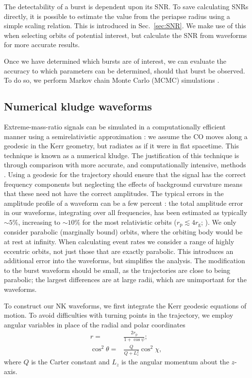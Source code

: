 \documentclass[useAMS,usedcolumn,usegraphicx,usenatbib]{mn2e}
\newcommand{\secref}[1]{Sec.~\ref{sec:#1}}
\newcommand{\sub}[1]{\ensuremath{_\mathrm{#1}}}
\begin{document}
The detectability of a burst is dependent upon its SNR. To save calculating SNRs directly, it is possible to estimate the value from the periapse radius using a simple scaling relation. This is introduced in \secref{SNR}. We make use of this when selecting orbits of potential interest, but calculate the SNR from waveforms for more accurate results.

Once we have determined which bursts are of interest, we can evaluate the accuracy to which parameters can be determined, should that burst be observed. To do so, we perform Markov chain Monte Carlo (MCMC) simulations \citep[chapter 29]{MacKay2003}.

\subsection{Numerical kludge waveforms}\label{sec:NK}

Extreme-mass-ratio signals can be simulated in a computationally efficient manner using a semirelativistic approximation \citep{Ruffini1981}: we assume the CO moves along a geodesic in the Kerr geometry, but radiates as if it were in flat spacetime. This technique is known as a numerical kludge. The justification of this technique is through comparison with more accurate, and computationally intensive, methods \citep{Gair2005, Babak2007}. Using a geodesic for the trajectory should ensure that the signal has the correct frequency components but neglecting the effects of background curvature means that these need not have the correct amplitudes. The typical errors in the amplitude profile of a waveform can be a few percent \citep{Tanaka1993,Gair2005}: the total amplitude error in our waveforms, integrating over all frequencies, has been estimated as typically $\sim 5\%$, increasing to $\sim 10\%$ for the most relativistic orbits ($r\sub{p} \lesssim 4 r\sub{g}$; \citealt{Berry2013}). We only consider parabolic (marginally bound) orbits, where the orbiting body would be at rest at infinity. When calculating event rates we consider a range of highly eccentric orbits, not just those that are exactly parabolic. This introduces an additional error into the waveforms, but simplifies the analysis. The modification to the burst waveform should be small, as the trajectories are close to being parabolic; the largest differences are at large radii, which are unimportant for the waveforms.

To construct our NK waveforms, we first integrate the Kerr geodesic equations of motion. To avoid difficulties with turning points in the trajectory, we employ angular variables in place of the radial and polar coordinates \citep{Drasco2004}
\begin{align}
r = {} & \frac{2 r\sub{p}}{1 + \cos\psi};\\
\cos^2\theta = {} & \frac{Q}{Q+L_z^2}\cos^2\chi,
\end{align}
where $Q$ is the Carter constant and $L_z$ is the angular momentum about the $z$-axis.
\end{document}
